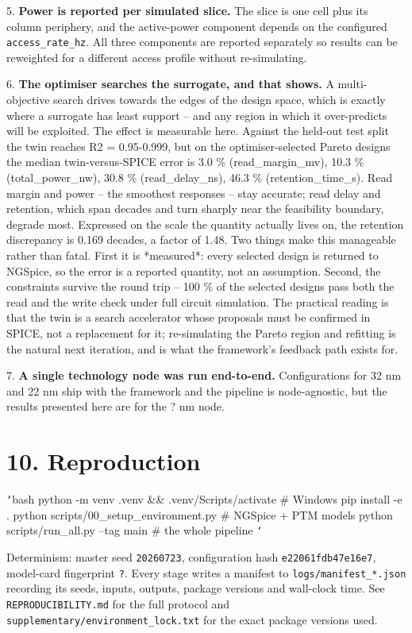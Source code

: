 \documentclass[conference]{IEEEtran}
\begin{document}
5. \textbf{Power is reported per simulated slice.} The slice is one cell plus its column
   periphery, and the active-power component depends on the configured
   \texttt{access\_rate\_hz}. All three components are reported separately so results can be
   reweighted for a different access profile without re-simulating.

6. \textbf{The optimiser searches the surrogate, and that shows.} A multi-objective search drives towards the edges of the design space, which is exactly where a surrogate has least support -- and any region in which it over-predicts will be exploited. The effect is measurable here. Against the held-out test split the twin reaches R2 = 0.95-0.999, but on the optimiser-selected Pareto designs the median twin-versus-SPICE error is 3.0 \% (read\_margin\_mv), 10.3 \% (total\_power\_nw), 30.8 \% (read\_delay\_ns), 46.3 \% (retention\_time\_s). Read margin and power -- the smoothest responses -- stay accurate; read delay and retention, which span decades and turn sharply near the feasibility boundary, degrade most. Expressed on the scale the quantity actually lives on, the retention discrepancy is 0.169 decades, a factor of 1.48. Two things make this manageable rather than fatal. First it is *measured*: every selected design is returned to NGSpice, so the error is a reported quantity, not an assumption. Second, the constraints survive the round trip -- 100 \% of the selected designs pass both the read and the write check under full circuit simulation. The practical reading is that the twin is a search accelerator whose proposals must be confirmed in SPICE, not a replacement for it; re-simulating the Pareto region and refitting is the natural next iteration, and is what the framework's feedback path exists for.

7. \textbf{A single technology node was run end-to-end.} Configurations for 32 nm and
   22 nm ship with the framework and the pipeline is node-agnostic, but the results
   presented here are for the ? nm node.

\section{10. Reproduction}
\texttt{`}bash
python -m venv .venv \&\& .venv/Scripts/activate      \# Windows
pip install -e .
python scripts/00\_setup\_environment.py              \# NGSpice + PTM models
python scripts/run\_all.py --tag main          \# the whole pipeline
\texttt{`}

Determinism: master seed \texttt{20260723}, configuration hash
\texttt{e22061fdb47e16e7}, model-card fingerprint \texttt{?}. Every
stage writes a manifest to \texttt{logs/manifest\_*.json} recording its seeds, inputs,
outputs, package versions and wall-clock time. See \texttt{REPRODUCIBILITY.md} for the
full protocol and \texttt{supplementary/environment\_lock.txt} for the exact package
versions used.
\end{document}
